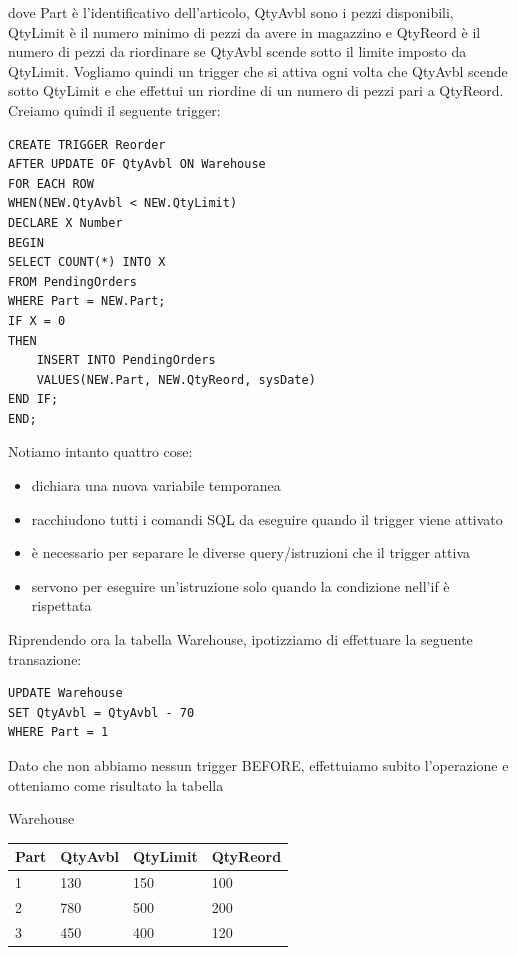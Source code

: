 \documentclass[11pt, a4paper, titlepage, oneside]{scrbook}
\begin{document}
dove Part è l'identificativo dell'articolo, QtyAvbl sono i pezzi disponibili, QtyLimit è il numero minimo di pezzi da avere in magazzino e QtyReord è il numero di pezzi da riordinare se QtyAvbl scende sotto il limite imposto da QtyLimit. Vogliamo quindi un trigger che si attiva ogni volta che QtyAvbl scende sotto QtyLimit e che effettui un riordine di un numero di pezzi pari a QtyReord. \\
Creiamo quindi il seguente trigger:

\begin{lstlisting}
CREATE TRIGGER Reorder
AFTER UPDATE OF QtyAvbl ON Warehouse
FOR EACH ROW
WHEN(NEW.QtyAvbl < NEW.QtyLimit)
DECLARE X Number
BEGIN
SELECT COUNT(*) INTO X
FROM PendingOrders
WHERE Part = NEW.Part;
IF X = 0
THEN
    INSERT INTO PendingOrders
    VALUES(NEW.Part, NEW.QtyReord, sysDate)
END IF;
END;
\end{lstlisting}

Notiamo intanto quattro cose:
\begin{itemize}
    \item {} dichiara una nuova variabile temporanea
    \item {} racchiudono tutti i comandi SQL da eseguire quando il trigger viene attivato
    \item \codeb{;} è necessario per separare le diverse query/istruzioni che il trigger attiva
    \item {} servono per eseguire un'istruzione solo quando la condizione nell'if è rispettata
\end{itemize}

Riprendendo ora la tabella Warehouse, ipotizziamo di effettuare la seguente transazione:
\begin{lstlisting}
UPDATE Warehouse
SET QtyAvbl = QtyAvbl - 70
WHERE Part = 1
\end{lstlisting}

Dato che non abbiamo nessun trigger BEFORE, effettuiamo subito l'operazione e otteniamo come risultato la tabella

\begin{center}
Warehouse \nopagebreak

\begin{tabular}{|l|l|l|l|}
\hline

\textbf{Part} & \textbf{QtyAvbl} & \textbf{QtyLimit} & \textbf{QtyReord}\\ \hline
1 & 130 & 150 & 100 \\
2 & 780 & 500 & 200 \\
3 & 450 & 400 & 120 \\ \hline
\end{tabular}
\end{center}
\end{document}
